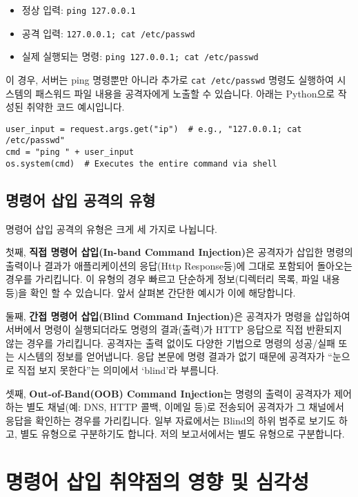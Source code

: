 \documentclass{article}
\begin{document}
\begin{itemize}
  \item 정상 입력: \texttt{ping 127.0.0.1}
  \item 공격 입력: \texttt{127.0.0.1; cat /etc/passwd}
  \item 실제 실행되는 명령: \texttt{ping 127.0.0.1; cat /etc/passwd}
\end{itemize}

이 경우, 서버는 ping 명령뿐만 아니라 추가로 \texttt{cat /etc/passwd} 명령도 실행하여 시스템의 패스워드 파일 내용을 공격자에게 노출할 수 있습니다.
아래는 Python으로 작성된 취약한 코드 예시입니다.

\begin{lstlisting}[caption={취약한 코드 예시 — ping 명령어에 사용자 입력을 직접 결합}]
user_input = request.args.get("ip")  # e.g., "127.0.0.1; cat /etc/passwd"
cmd = "ping " + user_input
os.system(cmd)  # Executes the entire command via shell
\end{lstlisting}

\subsection*{명령어 삽입 공격의 유형}
명령어 삽입 공격의 유형은 크게 세 가지로 나뉩니다. 

첫째, \textbf{직접 명령어 삽입(In-band Command Injection)}은 공격자가 삽입한 명령의 출력이나 결과가 애플리케이션의 응답(Http Response등)에 그대로 포함되어 돌아오는 경우를 가리킵니다.
이 유형의 경우 빠르고 단순하게 정보(디렉터리 목록, 파일 내용 등)을 확인 할 수 있습니다. 앞서 살펴본 간단한 예시가 이에 해당합니다.

둘째, \textbf{간접 명령어 삽입(Blind Command Injection)}은 공격자가 명령을 삽입하여 서버에서 명령이 실행되더라도 명령의 결과(출력)가 HTTP 응답으로 직접 반환되지 않는 경우를 가리킵니다.
공격자는 출력 없이도 다양한 기법으로 명령의 성공/실패 또는 시스템의 정보를 얻어냅니다. 
응답 본문에 명령 결과가 없기 때문에 공격자가 “눈으로 직접 보지 못한다”는 의미에서 ‘blind’라 부름니다.

셋째, \textbf{Out-of-Band(OOB) Command Injection}는 명령의 출력이 공격자가 제어하는 별도 채널(예: DNS, HTTP 콜백, 이메일 등)로 전송되어 공격자가 그 채널에서 응답을 확인하는 경우를 가리킵니다. 
일부 자료에서는 Blind의 하위 범주로 보기도 하고, 별도 유형으로 구분하기도 합니다. 저의 보고서에서는 별도 유형으로 구분합니다.


\section*{명령어 삽입 취약점의 영향 및 심각성}
\end{document}
